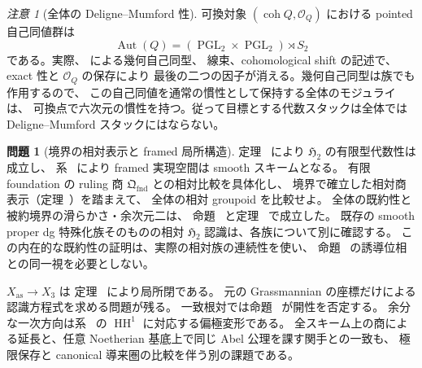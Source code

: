 \documentclass[a4paper,11pt]{ltjsarticle}
\numberwithin{equation}{section}
\theoremstyle{plain}
\theoremstyle{definition}
\newtheorem{problem}[theorem]{問題}
\theoremstyle{remark}
\newtheorem{remark}[theorem]{注意}
\newcommand{\HHstack}{\mathfrak H_2}
\DeclareMathOperator{\coh}{coh}
\begin{document}
\begin{remark}[全体の Deligne--Mumford 性]
可換対象 $(\coh Q,\mathcal O_Q)$ における pointed 自己同値群は
\[
 \operatorname{Aut}(Q)=(\operatorname{PGL}_2\times\operatorname{PGL}_2)\rtimes S_2
\]
である。実際、\cite[Theorem 3.1]{BondalOrlov2001} による幾何自己同型、
線束、cohomological shift の記述で、exact 性と $\mathcal O_Q$ の保存により
最後の二つの因子が消える。幾何自己同型は族でも作用するので、
この自己同値を通常の慣性として保持する全体のモジュライは、
可換点で六次元の慣性を持つ。従って目標とする代数スタックは全体では
Deligne--Mumford スタックにはならない。
\end{remark}

\begin{problem}[境界の相対表示と framed 局所構造]
定理~\cite[\texttt{thm:global-h2-smooth-finite-type}]{QuadricModuli2026} により $\HHstack$ の有限型代数性は成立し、
系~\cite[\texttt{cor:global-xas-smooth-scheme}]{QuadricModuli2026} により framed 実現空間は smooth スキームとなる。
有限 foundation の ruling 商 $\mathfrak Q_{\mathrm{fnd}}$ との相対比較を具体化し、
境界で確立した相対商表示（定理~\cite[\texttt{thm:noncubic-intrinsic-presentation-equivalence}]{QuadricModuli2026}）を踏まえて、
全体の相対 groupoid を比較せよ。
全体の既約性と被約境界の滑らかさ・余次元二は、
命題~\cite[\texttt{prop:global-h2-irreducible}]{QuadricModuli2026} と定理~\cite[\texttt{thm:noncubic-boundary-smooth-codim-two}]{QuadricModuli2026} で成立した。
既存の smooth proper dg 特殊化族そのものの相対 $\HHstack$ 認識は、各族について別に確認する。
この内在的な既約性の証明は、実際の相対族の連続性を使い、
命題~\cite[\texttt{prop:h2-component-density}]{QuadricModuli2026} の誘導位相との同一視を必要としない。

$X_{\mathrm{as}}\to X_3$ は
定理~\cite[\texttt{thm:polarization-inertia-open}]{QuadricModuli2026} により局所閉である。
元の Grassmannian の座標だけによる認識方程式を求める問題が残る。
一致根対では命題~\cite[\texttt{prop:global-h2-not-ambient-open}]{QuadricModuli2026} が開性を否定する。
余分な一次方向は系~\cite[\texttt{cor:artin-polarization-retraction}]{QuadricModuli2026} の
$\operatorname{HH}^1$ に対応する偏極変形である。
全スキーム上の商による延長と、任意 Noetherian 基底上で同じ Abel 公理を課す関手との一致も、
極限保存と canonical 導来圏の比較を伴う別の課題である。
\end{problem}



\end{document}
